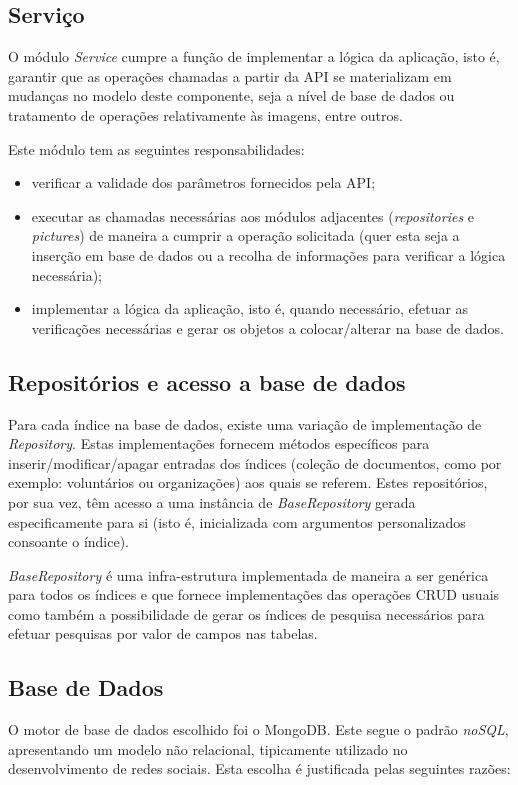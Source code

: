 \newpage

\subsection{Serviço}
O módulo \textit{Service} cumpre a função de implementar a lógica da aplicação, isto é, garantir que as operações chamadas a partir da API se materializam em mudanças no modelo deste componente, seja a nível de base de dados ou tratamento de operações relativamente às imagens, entre outros. \par \medskip

Este módulo tem as seguintes responsabilidades:
\begin{itemize}
	\item verificar a validade dos parâmetros fornecidos pela API;
	\item executar as chamadas necessárias aos módulos adjacentes (\textit{repositories} e \textit{pictures}) de maneira a cumprir a operação solicitada (quer esta seja a inserção em base de dados ou a recolha de informações para verificar a lógica necessária);
	\item implementar a lógica da aplicação, isto é, quando necessário, efetuar as verificações necessárias e gerar os objetos a colocar/alterar na base de dados.
\end{itemize}

\subsection{Repositórios e acesso a base de dados}
Para cada índice na base de dados, existe uma variação de implementação de \textit{Repository}. Estas implementações fornecem métodos específicos para inserir/modificar/apagar entradas dos índices (coleção de documentos, como por exemplo: voluntários ou organizações) aos quais se referem. Estes repositórios, por sua vez, têm acesso a uma instância de \textit{BaseRepository} gerada especificamente para si (isto é, inicializada com argumentos personalizados consoante o índice). \par \medskip

\textit{BaseRepository} é uma infra-estrutura implementada de maneira a ser genérica para todos os índices e que fornece implementações das operações CRUD usuais como também a possibilidade de gerar os índices de pesquisa necessários para efetuar pesquisas por valor de campos nas tabelas. \par \medskip

\subsection{Base de Dados}
O motor de base de dados escolhido foi o MongoDB. Este segue o padrão \textit{noSQL}, apresentando um modelo não relacional, tipicamente utilizado no desenvolvimento de redes sociais. Esta escolha é justificada pelas seguintes razões:


